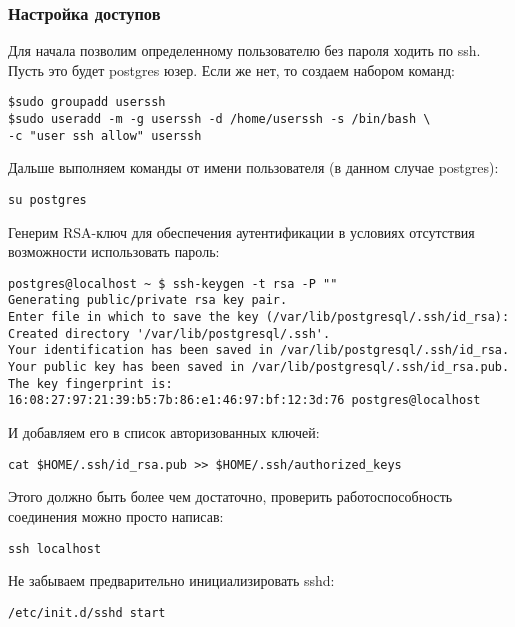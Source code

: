 \subsubsection{Настройка доступов}
Для начала позволим определенному пользователю без пароля ходить по ssh. Пусть это будет postgres юзер. 
Если же нет, то создаем набором команд:
\begin{lstlisting}[label=lst:streaming1,caption=Создаем пользователя userssh]
$sudo groupadd userssh
$sudo useradd -m -g userssh -d /home/userssh -s /bin/bash \
-c "user ssh allow" userssh
\end{lstlisting}

Дальше выполняем команды от имени пользователя (в данном случае postgres):
\begin{lstlisting}[label=lst:streaming2,caption=Логинимся под пользователем postgres]
su postgres
\end{lstlisting}

Генерим RSA-ключ для обеспечения аутентификации в условиях отсутствия возможности использовать пароль:
\begin{lstlisting}[label=lst:streaming3,caption=Генерим RSA-ключ]
postgres@localhost ~ $ ssh-keygen -t rsa -P ""
Generating public/private rsa key pair.
Enter file in which to save the key (/var/lib/postgresql/.ssh/id_rsa): 
Created directory '/var/lib/postgresql/.ssh'.
Your identification has been saved in /var/lib/postgresql/.ssh/id_rsa.
Your public key has been saved in /var/lib/postgresql/.ssh/id_rsa.pub.
The key fingerprint is:
16:08:27:97:21:39:b5:7b:86:e1:46:97:bf:12:3d:76 postgres@localhost
\end{lstlisting}

И добавляем его в список авторизованных ключей:
\begin{lstlisting}[label=lst:streaming4,caption=Добавляем его в список авторизованных ключей]
cat $HOME/.ssh/id_rsa.pub >> $HOME/.ssh/authorized_keys
\end{lstlisting}

Этого должно быть более чем достаточно, проверить работоспособность соединения можно просто написав:
\begin{lstlisting}[label=lst:streaming5,caption=Пробуем зайти на ssh без пароля]
ssh localhost
\end{lstlisting}

Не забываем предварительно инициализировать sshd:
\begin{lstlisting}[label=lst:streaming6,caption=Запуск sshd]
/etc/init.d/sshd start
\end{lstlisting}

